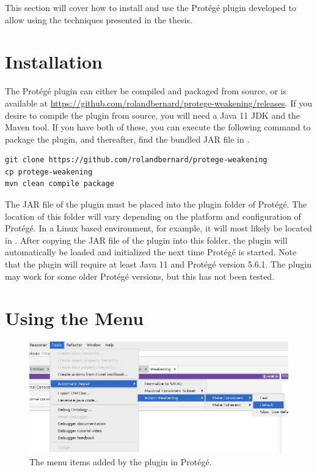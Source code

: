
This section will cover how to install and use the Protégé plugin developed to allow using the techniques presented in the thesis.

\section{Installation}

The Protégé plugin can either be compiled and packaged from source, or is available at \url{https://github.com/rolandbernard/protege-weakening/releases}. If you desire to compile the plugin from source, you will need a Java 11 JDK and the Maven tool. If you have both of these, you can execute the following command to package the plugin, and thereafter, find the bundled JAR file in .

\begin{lstlisting}
git clone https://github.com/rolandbernard/protege-weakening
cp protege-weakening
mvn clean compile package
\end{lstlisting}

The JAR file of the plugin must be placed into the plugin folder of Protégé. The location of this folder will vary depending on the platform and configuration of Protégé. In a Linux based environment, for example, it will most likely be located in . After copying the JAR file of the plugin into this folder, the plugin will automatically be loaded and initialized the next time Protégé is started. Note that the plugin will require at least Java 11 and Protégé version 5.6.1. The plugin may work for some older Protégé versions, but this has not been tested.

\section{Using the Menu}

\begin{figure}[htbp]
  \centering
  \includegraphics[width=\textwidth]{resources/protege-guide-menu.png}
  \caption{The menu items added by the plugin in Protégé.}
\end{figure}

